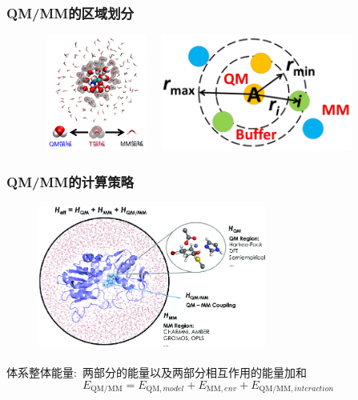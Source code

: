 \frame
{
	\frametitle{\textrm{QM/MM}的区域划分}
\begin{figure}[h!]
\centering
\vspace{-10.5pt}
\includegraphics[height=1.50in,width=1.51in,viewport=0 40 400 471,clip]{Figures/QM-T-MM.png}
\includegraphics[height=1.50in,width=2.55in,viewport=0 0 1087 660,clip]{Figures/QM-buffer-MM_Adaptive-Partitioning-Schematic.png}
\label{QM-buffer-MM}
\end{figure}
}

\frame
{
	\frametitle{\textrm{QM/MM}的计算策略}
\begin{figure}[h!]
\centering
\vspace{-10.5pt}
\includegraphics[height=1.90in,width=2.95in,viewport=0 0 700 450,clip]{Figures/QM-MM-treatment-of-a-biocatalytic-system.png}
\label{QM-MM-biocatalytic}
\end{figure}
体系整体能量:~两部分的能量以及两部分相互作用的能量加和
\begin{displaymath}
	E_{\mathrm{QM/MM}}=E_{\mathrm{QM},model}+E_{\mathrm{MM},env}+E_{\mathrm{QM/MM},interaction}
\end{displaymath}
}


